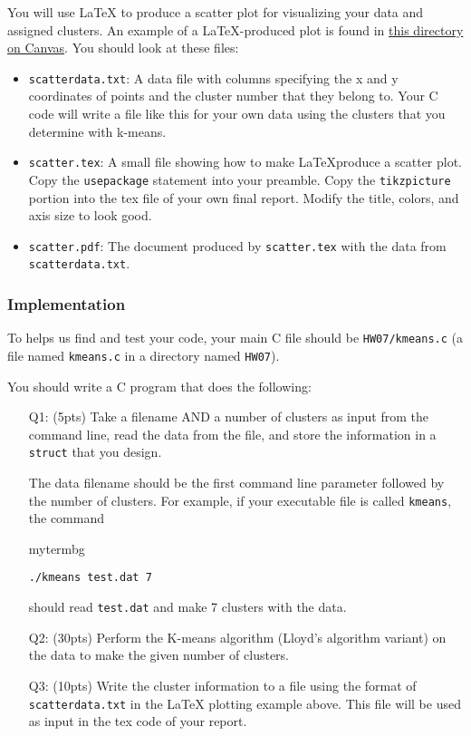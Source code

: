 You will use \LaTeX{} to produce a scatter plot for visualizing your data and assigned clusters.
An example of a \LaTeX{}-produced plot is found in \href{https://canvas.vt.edu/courses/95914/files/folder/Homework/LaTex\%20Plotting\%20Example#}{this directory on Canvas}.
You should look at these files:
\begin{itemize}
    \item \texttt{scatterdata.txt}: A data file with columns specifying the x and y coordinates of points and the cluster number that they belong to.
    Your C code will write a file like this for your own data using the clusters that you determine with k-means.
    \item \texttt{scatter.tex}: A small file showing how to make \LaTeX produce a scatter plot.
    Copy the \texttt{usepackage} statement into your preamble.
    Copy the \texttt{tikzpicture} portion into the tex file of your own final report.
    Modify the title, colors, and axis size to look good.
    \item \texttt{scatter.pdf}: The document produced by \texttt{scatter.tex} with the data from \texttt{scatterdata.txt}.
\end{itemize}

\subsubsection*{Implementation}

\begin{tcolorbox}[width=\textwidth,colback=green]
To helps us find and test your code, your main C file should be \texttt{HW07/kmeans.c} (a file named \texttt{kmeans.c} in a directory named \texttt{HW07}).
\end{tcolorbox}
You should write a C program that does the following:
\begin{enumerate}
    \item[Q1:] (5pts) Take a filename AND a number of clusters as input from the command line,
    read the data from the file,
    and store the information in a \texttt{struct} that you design.
    
    The data filename should be the first command line parameter followed by the number of clusters.
    For example, if your executable file is called \texttt{kmeans},
    the command
    \begin{tsession}{mytermbg}
    \begin{verbatim}
./kmeans test.dat 7\end{verbatim}
    \end{tsession}
    should read \texttt{test.dat} and make 7 clusters with the data.
    \item[Q2:] (30pts) Perform the K-means algorithm (Lloyd's algorithm variant) on the data to make the given number of clusters.
    \item[Q3:] (10pts) Write the cluster information to a file using the format of \texttt{scatterdata.txt} in the \LaTeX{} plotting example above.
    This file will be used as input in the tex code of your report.
\end{enumerate}

